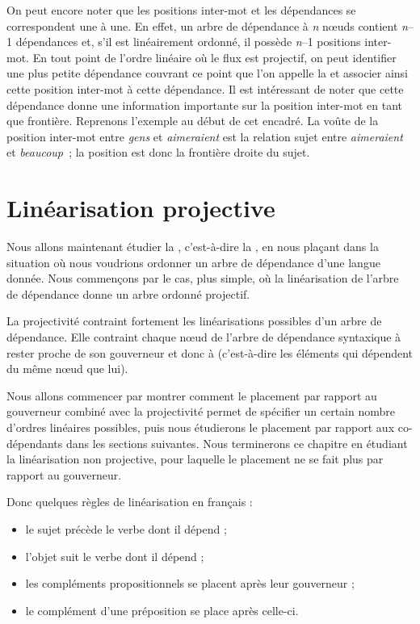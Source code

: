 {    On peut encore noter que les positions inter-mot et les dépendances se correspondent une à une. En effet, un arbre de dépendance à \textit{n} nœuds contient \textit{n}–1 dépendances et, s’il est linéairement ordonné, il possède \textit{n}–1 positions inter-mot. En tout point de l’ordre linéaire où le flux est projectif, on peut identifier une plus petite dépendance couvrant ce point que l’on appelle la  et associer ainsi cette position inter-mot à cette dépendance. Il est intéressant de noter que cette dépendance donne une information importante sur la position inter-mot en tant que frontière. Reprenons l’exemple au début de cet encadré. La voûte de la position inter-mot entre \textit{gens} et \textit{aimeraient} est la relation sujet entre \textit{aimeraient} et \textit{beaucoup~}; la position est donc la frontière droite du sujet.
}
\section{Linéarisation projective}\label{sec:3.5.18}

Nous allons maintenant étudier la , c’est-à-dire la , en nous plaçant dans la situation où nous voudrions ordonner un arbre de dépendance d’une langue donnée. Nous commençons par le cas, plus simple, où la linéarisation de l’arbre de dépendance donne un arbre ordonné projectif.

La projectivité contraint fortement les linéarisations possibles d’un arbre de dépendance. Elle contraint chaque nœud de l’arbre de dépendance syntaxique à rester proche de son gouverneur et donc à  (c’est-à-dire les éléments qui dépendent du même nœud que lui).

Nous allons commencer par montrer comment le placement par rapport au gouverneur combiné avec la projectivité permet de spécifier un certain nombre d’ordres linéaires possibles, puis nous étudierons le placement par rapport aux co-dépendants dans les sections suivantes. Nous terminerons ce chapitre en étudiant la linéarisation non projective, pour laquelle le placement ne se fait plus par rapport au gouverneur.


Donc quelques règles de linéarisation en français :

\begin{itemize}
\item le sujet précède le verbe dont il dépend ;
\item l’objet suit le verbe dont il dépend ;
\item les compléments propositionnels se placent après leur gouverneur ;
\item le complément d’une préposition se place après celle-ci.
\end{itemize}

